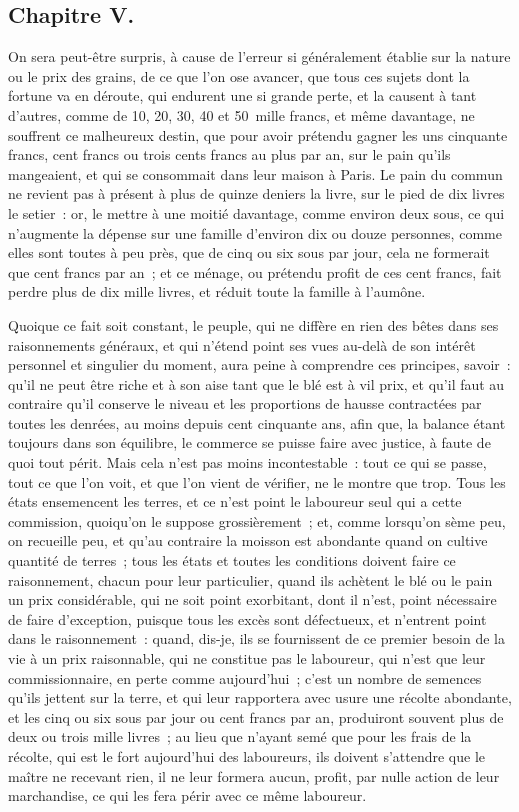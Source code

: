 \documentclass[french,twoside]{book} %
\begin{document}
\subsection[{Chapitre V.}]{Chapitre V.}
\noindent On sera peut-être surpris, à cause de l’erreur si généralement établie sur la nature ou le prix des grains, de ce que l’on ose avancer, que tous ces sujets dont la fortune va en déroute, qui endurent une si grande perte, et la causent à tant d’autres, comme de 10, 20, 30, 40 et 50 mille francs, et même davantage, ne souffrent ce malheureux destin, que pour avoir prétendu gagner les uns cinquante francs, cent francs ou trois cents francs au plus par an, sur le pain qu’ils mangeaient, et qui se consommait dans leur maison à Paris. Le pain du commun ne revient pas à présent à plus de quinze deniers la livre, sur le pied de dix livres le setier : or, le mettre à une moitié davantage, comme environ deux sous, ce qui n’augmente la dépense sur une famille d’environ dix ou douze personnes, comme elles sont toutes à peu près, que de cinq ou six sous par jour, cela ne formerait que cent francs par an ; et ce ménage, ou prétendu profit de ces cent francs, fait perdre plus de dix mille livres, et réduit toute la famille à l’aumône.\par
Quoique ce fait soit constant, le peuple, qui ne diffère en rien des bêtes dans ses raisonnements généraux, et qui n’étend point ses vues au-delà de son intérêt personnel et singulier du moment, aura peine à comprendre ces principes, savoir : qu’il ne peut être riche et à son aise tant que le blé est à vil prix, et qu’il faut au contraire qu’il conserve le niveau et les proportions de hausse contractées par toutes les denrées, au moins depuis cent cinquante ans, afin que, la balance étant toujours dans son équilibre, le commerce se puisse faire avec justice, à faute de quoi tout périt. Mais cela n’est pas moins incontestable : tout ce qui se passe, tout ce que l’on voit, et que l’on vient de vérifier, ne le montre que trop. Tous les états ensemencent les terres, et ce n’est point le laboureur seul qui a cette commission, quoiqu’on le suppose grossièrement ; et, comme lorsqu’on sème peu, on recueille peu, et qu’au contraire la moisson est abondante quand on cultive quantité de terres ; tous les états et toutes les conditions doivent faire ce raisonnement, chacun pour leur particulier, quand ils achètent le blé ou le pain un prix considérable, qui ne soit point exorbitant, dont il n’est, point nécessaire de faire d’exception, puisque tous les excès sont défectueux, et n’entrent point dans le raisonnement : quand, dis-je, ils se fournissent de ce premier besoin de la vie à un prix raisonnable, qui ne constitue pas le laboureur, qui n’est que leur commissionnaire, en perte comme aujourd’hui ; c’est un nombre de semences qu’ils jettent sur la terre, et qui leur rapportera avec usure une récolte abondante, et les cinq ou six sous par jour ou cent francs par an, produiront souvent plus de deux ou trois mille livres ; au lieu que n’ayant semé que pour les frais de la récolte, qui est le fort aujourd’hui des laboureurs, ils doivent s’attendre que le maître ne recevant rien, il ne leur formera aucun, profit, par nulle action de leur marchandise, ce qui les fera périr avec ce même laboureur.\par
\end{document}
